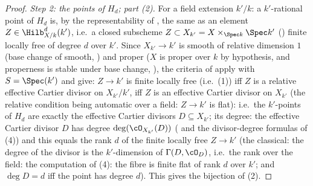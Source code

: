 \begin{proof}
\emph{Step 2: the points of $H_d$; part (2).}  For a field extension
$k'/k$: a $k'$-rational point of $H_d$ is, by the representability of
, the same as an element
$Z\in\Hilb^d_{X/k}(k')$, i.e.\ a closed subscheme
$Z\subset X_{k'}=X\times_{\Spec k}\Spec k'$ ()
finite locally free of degree $d$ over $k'$.  Since $X_{k'}\to k'$ is
smooth of relative dimension $1$ (base change of smooth,
) and proper ($X$ is proper over $k$ by
hypothesis, and properness is stable under base change,
), the
criteria of  apply with
$S=\Spec(k')$ and give: $Z\to k'$ is finite locally free
(i.e.\ (1)) iff $Z$ is a relative effective Cartier divisor on
$X_{k'}/k'$, iff $Z$ is an effective Cartier divisor on $X_{k'}$
(the relative condition being automatic over a field:
$Z\to k'$ is flat): i.e.\ the $k'$-points of $H_d$ are exactly the
effective Cartier divisors $D\subseteq X_{k'}$; its degree: the
effective Cartier divisor $D$ has degree $\deg(\cO_{X_{k'}}(D))$
( and the divisor-degree formulas of
(4)) and this equals the rank $d$ of
the finite locally free $Z\to k'$ (the classical: the degree of the
divisor is the $k'$-dimension of $\Gamma(D,\cO_D)$, i.e.\ the rank over
the field: the computation of (4): the fibre is
finite flat of rank $d$ over $k'$; and $\deg D=d$ iff the point has
degree $d$).  This gives the bijection of (2).


\end{proof}
